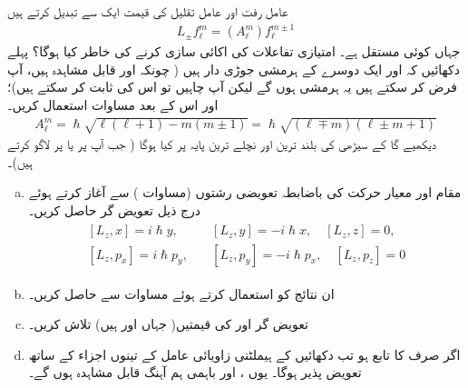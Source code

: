 عامل رفت اور عامل تقلیل  کی قیمت ایک  سے تبدیل کرتے ہیں 
\begin{align}\label{مساوات_تین_ابعاد_عامل_تقلیل_رفعت_اکائی_تبدیلی}
L_{\pm} f_{\ell}^m = (A_{\ell}^m) f_{\ell}^{m \pm 1}
\end{align}
جہاں  کوئی مستقل ہے۔  امتیازی تفاعلات کی اکائی سازی کرنے کی خاطر  کیا ہوگا؟  پہلے دکھائیں کہ  اور  ایک دوسرے کے ہرمشی جوڑی دار ہیں ( چونکہ  اور  قابل مشاہدہ ہیں، آپ فرض کر سکتے ہیں یہ ہرمشی ہوں گے لیکن آپ چاہیں تو اس کی ثابت کر سکتے ہیں)؛ اور اس کے بعد مساوات  استعمال کریں۔  
\begin{align}\label{مساوات_تین_ابعادی_اے_ایل_ایم}
A_{\ell}^m = \hslash \sqrt{\ell (\ell +1) - m (m \pm 1)} = \hslash \sqrt{(\ell \mp m)(\ell \pm m + 1)} 
\end{align}
دیکھیے گا کے سیڑھی کی بلند ترین اور نچلے ترین پایہ پر کیا ہوگا ( جب آپ  پر  یا  پر  لاگو کرتے ہیں)۔ 
\begin{enumerate}[a.]
\item
مقام اور معیار حرکت کی باضابطہ  تعویضی  رشتوں (مساوات ) سے آغاز کرتے ہوئے درج ذیل  تعویض گر حاصل کریں۔
\begin{gather}
\begin{aligned}\label{مساوات_تین_ابعادی_مقلبی_رشتے}
[L_z , x] = i \hslash y, & \quad [L_z , y] = - i \hslash x, \quad [L_z , z] = 0, \\
 [L_z , p_x] = i \hslash p_y , &\quad [L_z , p_y] = - i \hslash p_x , \quad [L_z , p_z] = 0
\end{aligned}
\end{gather}
\item
ان نتائج کو استعمال کرتے ہوئے مساوات  سے  حاصل کریں۔
\item
تعویض گر  اور  کی قیمتیں( جہاں  اور  ہیں) تلاش کریں۔
\item
اگر  صرف  کا تابع ہو تب دکھائیں کے ہیملٹنی  زاویائی عامل  کے تینوں اجزاء کے ساتھ تعویض پذیر ہوگا۔ یوں ،  اور  باہمی ہم آہنگ قابل مشاہدہ ہوں گے۔
\end{enumerate}
